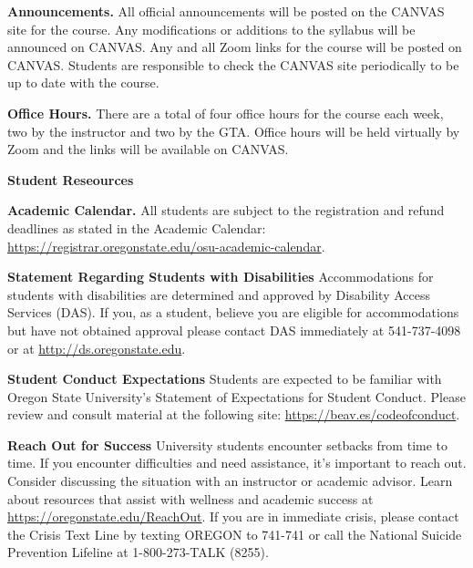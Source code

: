 \documentclass{article}
\begin{document}
\bigskip

\noindent \textbf{Announcements.} All official announcements will be posted on the CANVAS site for the course. Any modifications or additions to the syllabus will be announced on CANVAS. Any and all Zoom links for the course will be posted on CANVAS. Students are responsible to check the CANVAS site periodically to be up to date with the course.

\bigskip

\noindent \textbf{Office Hours.} There are a total of four office hours for the course each week, two by the instructor and two by the GTA. Office hours will be held virtually by Zoom and the links will be available on CANVAS.

\bigskip

\begin{large}
\noindent \textbf{Student Reseources}
\end{large}

\bigskip

\noindent \textbf{Academic Calendar.} All students are subject to the registration and refund deadlines as stated in the Academic Calendar: \href{ https://registrar.oregonstate.edu/osu-academic-calendar}{https://registrar.oregonstate.edu/osu-academic-calendar}.

\bigskip

\noindent \textbf{Statement Regarding Students with Disabilities} Accommodations for students with disabilities are determined and approved by Disability Access Services (DAS). If you, as a student, believe you are eligible for accommodations but have not obtained approval please contact DAS immediately at 541-737-4098 or at \href{ http://ds.oregonstate.edu}{http://ds.oregonstate.edu}.

\bigskip

\noindent \textbf{Student Conduct Expectations} Students are expected to be familiar with Oregon State University’s Statement of Expectations for Student Conduct. Please review and consult material at the following site: \href{https://beav.es/codeofconduct}{https://beav.es/codeofconduct}.

\bigskip

\noindent \textbf{Reach Out for Success} University students encounter setbacks from time to time. If you encounter difficulties and need assistance, it’s important to reach out. Consider discussing the situation with an instructor or academic advisor. Learn about resources that assist with wellness and academic success at \href{https://oregonstate.edu/ReachOut}{https://oregonstate.edu/ReachOut}. If you are in immediate crisis, please contact the Crisis Text Line by texting OREGON to 741-741 or call the National Suicide Prevention Lifeline at 1-800-273-TALK (8255).
\end{document}
